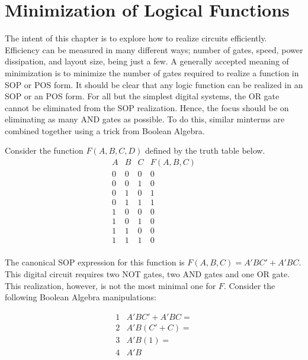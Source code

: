 \chapter{Minimization of Logical Functions}
\label{chapter:Minimization of Logical Functions}
\graphicspath{ {./chapter03/Fig} }

The intent of this chapter is to explore how to realize 
circuits efficiently.  Efficiency can be measured in
many different ways; number of gates, speed, power
dissipation, and layout size, being just a few. A generally
accepted meaning of minimization is to 
 minimize the number of gates required to realize 
a function in SOP or POS form.  It should be clear that
any logic function can be realized in an SOP or an POS form.
For all but the simplest digital systems, the OR gate cannot 
be eliminated from the SOP realization.  Hence, the focus should 
be on eliminating as many AND gates as possible.
To do this, similar minterms are combined together 
using a trick from Boolean Algebra.

Consider the function $F(A,B,C,D)$ defined by the truth table
below.
$$\begin{array}{c|c|c||c}
A & B & C & F(A,B,C)  \\ \hline
0 & 0 & 0 & 0 \\ \hline
0 & 0 & 1 & 0 \\ \hline
0 & 1 & 0 & 1 \\ \hline
0 & 1 & 1 & 1 \\ \hline
1 & 0 & 0 & 0 \\ \hline
1 & 0 & 1 & 0 \\ \hline
1 & 1 & 0 & 0 \\ \hline
1 & 1 & 1 & 0 \\
\end{array} $$

The canonical SOP expression for this function is $F(A,B,C)=A'BC' + A'BC$.  
This digital circuit requires two NOT gates, two AND gates and one OR gate.  
This realization, however, is not the most minimal one for $F$.  Consider 
the following Boolean Algebra manipulations:

$$\begin{array}{cl}
1 & A'BC' + A'BC = \\
2 & A'B(C' + C) = \\
3 & A'B(1) = \\
4 & A'B
\end{array}$$

